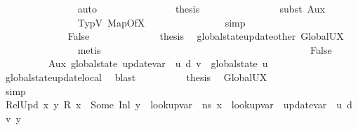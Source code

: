 \begin{isabellebody}
\ \ \ \ \ \ \ \ \ \ \ \ \ \ \isamarkupfalse%
\ auto\isanewline
\ \ \ \ \ \ \ \ \ \ \ \ \isamarkupfalse%
\ \isamarkupfalse%
\ {\isacharquery}{\kern0pt}thesis\isanewline
\ \ \ \ \ \ \ \ \ \ \ \ \ \ \isamarkupfalse%
\ {\isacharparenleft}{\kern0pt}subst\ Aux{}{\isacharparenright}{\kern0pt}\isanewline
\ \ \ \ \ \ \ \ \ \ \ \ \ \ \isamarkupfalse%
\ TypV\ MapOfX\isanewline
\ \ \ \ \ \ \ \ \ \ \ \ \ \ \isamarkupfalse%
\ simp\isanewline
\ \ \ \ \ \ \ \ \ \ \isamarkupfalse%
\isanewline
\ \ \ \ \ \ \ \ \ \ \ \ \isamarkupfalse%
\ False\isanewline
\ \ \ \ \ \ \ \ \ \ \ \ \isamarkupfalse%
\ {\isacharquery}{\kern0pt}thesis\ \isamarkupfalse%
\ global{\isacharunderscore}{\kern0pt}state{\isacharunderscore}{\kern0pt}update{\isacharunderscore}{\kern0pt}other\ GlobalUX\isanewline
\ \ \ \ \ \ \ \ \ \ \ \ \ \ \isamarkupfalse%
\ metis\ \ \ \ \ \ \ \ \ \ \ \ \ \ \ \isanewline
\ \ \ \ \ \ \ \ \ \ \isamarkupfalse%
\isanewline
\ \ \ \ \ \ \isamarkupfalse%
\isanewline
\ \ \ \ \ \ \ \ \isamarkupfalse%
\ False\isanewline
\ \ \ \ \ \ \ \ \isamarkupfalse%
\ Aux{}{\isacharcolon}{\kern0pt}\ {\isachardoublequoteopen}global{\isacharunderscore}{\kern0pt}state\ {\isacharparenleft}{\kern0pt}update{\isacharunderscore}{\kern0pt}var\ {\isasymLambda}{\isacharprime}{\kern0pt}\ u\ d\ v{\isacharparenright}{\kern0pt}\ {\isacharequal}{\kern0pt}\ global{\isacharunderscore}{\kern0pt}state\ u{\isachardoublequoteclose}\ \isamarkupfalse%
\ global{\isacharunderscore}{\kern0pt}state{\isacharunderscore}{\kern0pt}update{\isacharunderscore}{\kern0pt}local\ \isamarkupfalse%
\ blast\isanewline
\ \ \ \ \ \ \ \ \isamarkupfalse%
\ {\isacharquery}{\kern0pt}thesis\ \isamarkupfalse%
\ GlobalUX\ \isamarkupfalse%
\ simp\ \ \ \ \ \ \ \ \ \ \ \ \ \isanewline
\ \ \ \ \ \ \ \ \isamarkupfalse%
\isanewline
\ \ \ \ \isamarkupfalse%
\isanewline
\ \ \ \ \isamarkupfalse%
\ Rel{}Upd{\isacharcolon}{\kern0pt}\ {\isachardoublequoteopen}{\isasymforall}x\ y{\isachardot}{\kern0pt}\ R\ x\ {\isacharequal}{\kern0pt}\ Some\ {\isacharparenleft}{\kern0pt}Inl\ y{\isacharparenright}{\kern0pt}\ {\isasymlongrightarrow}\ lookup{\isacharunderscore}{\kern0pt}var\ {\isasymLambda}\ ns\ x\ {\isacharequal}{\kern0pt}\ lookup{\isacharunderscore}{\kern0pt}var\ {\isasymLambda}{\isacharprime}{\kern0pt}\ {\isacharparenleft}{\kern0pt}update{\isacharunderscore}{\kern0pt}var\ {\isasymLambda}{\isacharprime}{\kern0pt}\ u\ d\ v{\isacharparenright}{\kern0pt}\ y{\isachardoublequoteclose}\isanewline

\end{isabellebody}
